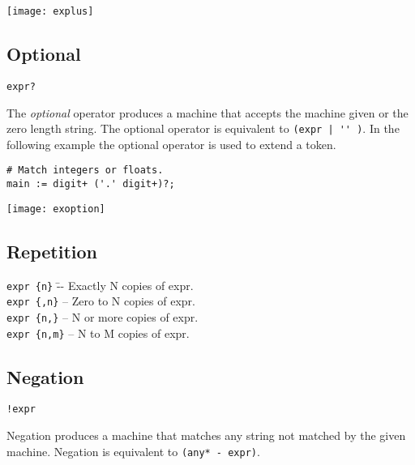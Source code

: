\documentclass[letterpaper,11pt,oneside]{book}
\newcommand{\verbspace}{\vspace{10pt}}
\newcommand{\graphspace}{\vspace{10pt}}
\newenvironment{inline_code}{\def\baselinestretch{1}\vspace{12pt}\small}{}
\begin{document}
\graphspace
\begin{center}
\texttt{[image: explus]}
\end{center}
\graphspace

\subsection{Optional}

\verb|expr?|
\verbspace

The {\em optional} operator produces a machine that accepts the machine
given or the zero length string. The optional operator is equivalent to
\verb/(expr | '' )/. In the following example the optional operator is used to
extend a token.

\begin{inline_code}
\begin{verbatim}
# Match integers or floats.
main := digit+ ('.' digit+)?;
\end{verbatim}
\end{inline_code}

\graphspace
\begin{center}
\texttt{[image: exoption]}
\end{center}
\graphspace


\subsection{Repetition}

\begin{tabbing}
\noindent \verb|expr {n}| \hspace{16pt}\=-- Exactly N copies of expr.\\

\noindent \verb|expr {,n}| \>-- Zero to N copies of expr.\\

\noindent \verb|expr {n,}| \>-- N or more copies of expr.\\

\noindent \verb|expr {n,m}| \>-- N to M copies of expr.
\end{tabbing}

\subsection{Negation}

\verb|!expr|
\verbspace

Negation produces a machine that matches any string not matched by the given
machine. Negation is equivalent to \verb|(any* - expr)|.
\end{document}
